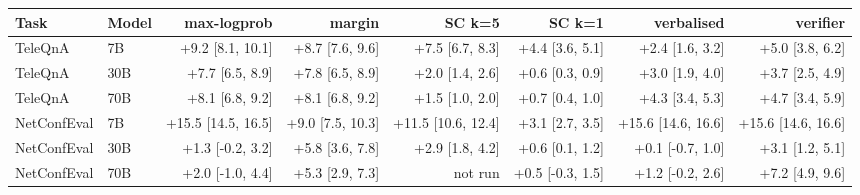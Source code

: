 \begin{tabular}{llrrrrrr}
\toprule
Task & Model & max-logprob & margin & SC k=5 & SC k=1 & verbalised & verifier \\
\midrule
TeleQnA & 7B & +9.2 [8.1, 10.1] & +8.7 [7.6, 9.6] & +7.5 [6.7, 8.3] & +4.4 [3.6, 5.1] & +2.4 [1.6, 3.2] & +5.0 [3.8, 6.2] \\
TeleQnA & 30B & +7.7 [6.5, 8.9] & +7.8 [6.5, 8.9] & +2.0 [1.4, 2.6] & +0.6 [0.3, 0.9] & +3.0 [1.9, 4.0] & +3.7 [2.5, 4.9] \\
TeleQnA & 70B & +8.1 [6.8, 9.2] & +8.1 [6.8, 9.2] & +1.5 [1.0, 2.0] & +0.7 [0.4, 1.0] & +4.3 [3.4, 5.3] & +4.7 [3.4, 5.9] \\
NetConfEval & 7B & +15.5 [14.5, 16.5] & +9.0 [7.5, 10.3] & +11.5 [10.6, 12.4] & +3.1 [2.7, 3.5] & +15.6 [14.6, 16.6] & +15.6 [14.6, 16.6] \\
NetConfEval & 30B & +1.3 [-0.2, 3.2] & +5.8 [3.6, 7.8] & +2.9 [1.8, 4.2] & +0.6 [0.1, 1.2] & +0.1 [-0.7, 1.0] & +3.1 [1.2, 5.1] \\
NetConfEval & 70B & +2.0 [-1.0, 4.4] & +5.3 [2.9, 7.3] & not run & +0.5 [-0.3, 1.5] & +1.2 [-0.2, 2.6] & +7.2 [4.9, 9.6] \\
\bottomrule
\end{tabular}
